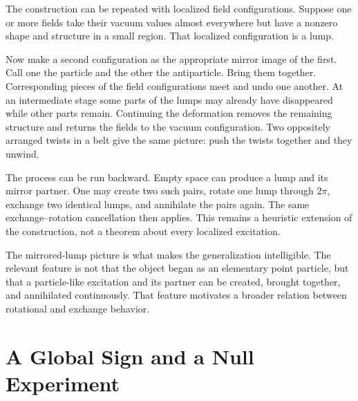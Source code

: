 The construction can be repeated with localized field configurations. Suppose one or more fields take their vacuum values almost everywhere but have a nonzero shape and structure in a small region. That localized configuration is a lump.

Now make a second configuration as the appropriate mirror image of the first. Call one the particle and the other the antiparticle. Bring them together. Corresponding pieces of the field configurations meet and undo one another. At an intermediate stage some parts of the lumps may already have disappeared while other parts remain. Continuing the deformation removes the remaining structure and returns the fields to the vacuum configuration. Two oppositely arranged twists in a belt give the same picture: push the twists together and they unwind.

The process can be run backward. Empty space can produce a lump and its mirror partner. One may create two such pairs, rotate one lump through \(2\pi\), exchange two identical lumps, and annihilate the pairs again. The same exchange--rotation cancellation then applies. This remains a heuristic extension of the construction, not a theorem about every localized excitation.

\begin{classroomqa}
\end{classroomqa}

The mirrored-lump picture is what makes the generalization intelligible. The relevant feature is not that the object began as an elementary point particle, but that a particle-like excitation and its partner can be created, brought together, and annihilated continuously. That feature motivates a broader relation between rotational and exchange behavior.

\begin{classroomqa}
\end{classroomqa}

\section{A Global Sign and a Null Experiment}

